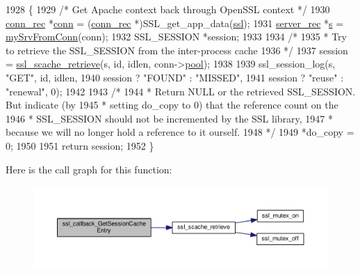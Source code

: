 \begin{DoxyCode}
1928 \{
1929     \textcolor{comment}{/* Get Apache context back through OpenSSL context */}
1930     \hyperlink{structconn__rec}{conn\_rec} *\hyperlink{group__MOD__PROXY_gaaf2a99e7e3709d3e41bf0a33f1004b4e}{conn} = (\hyperlink{structconn__rec}{conn\_rec} *)SSL\_get\_app\_data(\hyperlink{group__MOD__SSL_ga91d808d6c1c01029f9c9260b9b69a437}{ssl});
1931     \hyperlink{structserver__rec}{server\_rec} *\hyperlink{group__APACHE__CORE__LISTEN_ga9359ed159c8b295541e3770172d34550}{s}  = \hyperlink{group__MOD__SSL__PRIVATE_ga20a45d64a09acadc21debea6057f62a8}{mySrvFromConn}(conn);
1932     SSL\_SESSION *session;
1933 
1934     \textcolor{comment}{/*}
1935 \textcolor{comment}{     * Try to retrieve the SSL\_SESSION from the inter-process cache}
1936 \textcolor{comment}{     */}
1937     session = \hyperlink{group__MOD__SSL__PRIVATE_ga8af03ed4b01826deda49fb57e648786e}{ssl\_scache\_retrieve}(s, \textcolor{keywordtype}{id}, idlen, conn->\hyperlink{structconn__rec_a1dc5f31c7afc4a6f9c4ede0daea8cd1d}{pool});
1938 
1939     ssl\_session\_log(s, \textcolor{stringliteral}{"GET"}, \textcolor{keywordtype}{id}, idlen,
1940                     session ? \textcolor{stringliteral}{"FOUND"} : \textcolor{stringliteral}{"MISSED"},
1941                     session ? \textcolor{stringliteral}{"reuse"} : \textcolor{stringliteral}{"renewal"}, 0);
1942 
1943     \textcolor{comment}{/*}
1944 \textcolor{comment}{     * Return NULL or the retrieved SSL\_SESSION. But indicate (by}
1945 \textcolor{comment}{     * setting do\_copy to 0) that the reference count on the}
1946 \textcolor{comment}{     * SSL\_SESSION should not be incremented by the SSL library,}
1947 \textcolor{comment}{     * because we will no longer hold a reference to it ourself.}
1948 \textcolor{comment}{     */}
1949     *do\_copy = 0;
1950 
1951     \textcolor{keywordflow}{return} session;
1952 \}
\end{DoxyCode}


Here is the call graph for this function\+:
\nopagebreak
\begin{figure}[H]
\begin{center}
\leavevmode
\includegraphics[width=350pt]{group__MOD__SSL__PRIVATE_ga49bc9eacebfb50fb02aa08dcc114cdc8_cgraph}
\end{center}
\end{figure}




